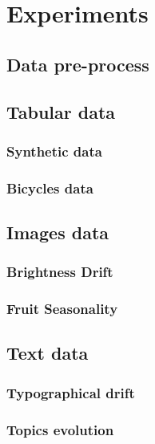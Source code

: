 \chapter{Experiments}\label{ch:experiments}

\section{Data pre-process}\label{sec:preprocess}

\section{Tabular data}\label{sec:tabular_data}

\subsection{Synthetic data}\label{subsec:sythetic_data}

\subsection{Bicycles data}\label{subsec:bicycles_data}

\section{Images data}\label{sec:images_data}

\subsection{Brightness Drift}\label{subsec:contrast_drift}

\subsection{Fruit Seasonality}\label{subsec:fruit_seasonality}

\section{Text data}\label{sec:text_data}

\subsection{Typographical drift}\label{subsec:typographical_drift}

\subsection{Topics evolution}\label{subsec:topics_evolution}